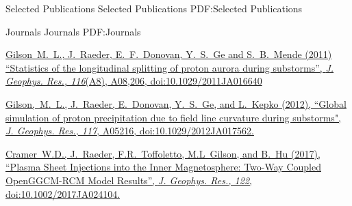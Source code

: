 \documentclass[letterpaper,MMMyyyy,nonstopmode]{simpleresumecv}
\begin{document}
\begin{Body}




\Section
{Selected Publications}
{Selected Publications}
{PDF:Selected Publications}

\SubSection
{Journals}
{Journals}
{PDF:Journals}

\BigGap
\href{http://onlinelibrary.wiley.com/doi/10.1029/2011JA016640/abstract}
{\underline{Gilson~M.~L.}, J.~Raeder, E.~F.~Donovan, Y.~S.~Ge and S.~B.~Mende (2011)
``Statistics of the longitudinal splitting of proton aurora during substorms'',
\textit{J. Geophys. Res., 116}(A8), A08,206, doi:10.1029/2011JA016640}

\BigGap
\href{http://onlinelibrary.wiley.com/doi/10.1029/2012JA017562/full}
{\underline{Gilson,~M.~L.}, J.~Raeder, E.~Donovan, Y.~S.~Ge, and L.~Kepko (2012), ``Global simulation of proton precipitation due to field line curvature during substorms",
\textit{J. Geophys. Res., 117}, A05216, doi:10.1029/2012JA017562.}

\BigGap
\href{http://onlinelibrary.wiley.com/doi/10.1002/2017JA024104/full}
{Cramer~W.D., J.~Raeder, F.R.~Toffoletto, \underline{M.L~Gilson}, and B.~Hu (2017), ``Plasma Sheet Injections into the Inner Magnetosphere: Two-Way Coupled OpenGGCM-RCM Model Results'',
\textit{J. Geophys. Res., 122}, doi:10.1002/2017JA024104.}









\end{Body}
\end{document}
